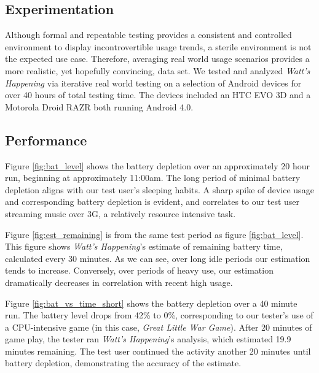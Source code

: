 \subsection{Experimentation}
Although formal and repeatable testing provides a consistent and controlled environment to display incontrovertible usage trends, a sterile environment is not the expected use case.
Therefore, averaging real world usage scenarios provides a more realistic, yet hopefully convincing, data set.
We tested and analyzed \emph{Watt's Happening} via iterative real world testing on a selection of Android devices for over 40 hours of total testing time.
The devices included an HTC EVO 3D and a Motorola Droid RAZR both running Android 4.0. 

\subsection{Performance}
Figure \ref{fig:bat_level} shows the battery depletion over an approximately 20 hour run, beginning at approximately 11:00am. 
The long period of minimal battery depletion aligns with our test user's sleeping habits.
A sharp spike of device usage and corresponding battery depletion is evident, and correlates to our test user streaming music over 3G, a relatively resource intensive task.

Figure \ref{fig:est_remaining} is from the same test period as figure \ref{fig:bat_level}.
This figure shows \emph{Watt's Happening}'s estimate of remaining battery time, calculated every 30 minutes.
As we can see, over long idle periods our estimation tends to increase.
Conversely, over periods of heavy use, our estimation dramatically decreases in correlation with recent high usage.

Figure \ref{fig:bat_vs_time_short} shows the battery depletion over a 40 minute run.
The battery level drops from 42\% to 0\%, corresponding to our tester's use of a CPU-intensive game (in this case, \emph{Great Little War Game}\cite{glwg}).
After 20 minutes of game play, the tester ran \emph{Watt's Happening}'s analysis, which estimated 19.9 minutes remaining.
The test user continued the activity another 20 minutes until battery depletion, demonstrating the accuracy of the estimate.

